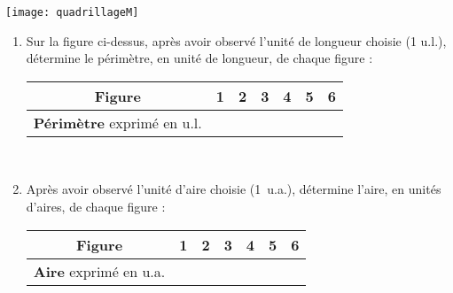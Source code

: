 \begin{exercice}[Quadrillage]
\begin{center} \texttt{[image: quadrillageM]} \end{center}
\begin{enumerate}
 \item Sur la figure ci-dessus, après avoir observé l’unité de longueur choisie (1 u.l.), détermine le périmètre, en unité de longueur, de chaque figure :
 \begin{tabularx}{\linewidth}{|c|X|X|X|X|X|X|}
\hline
\textbf{Figure} & \textbf{1} & \textbf{2} & \textbf{3} & \textbf{4} & \textbf{5} & \textbf{6} \\\hline
\textbf{Périmètre} exprimé en u.l. & & & & & & \\\hline
 \end{tabularx} \\ 
 \item Après avoir observé l’unité d’aire choisie (1 u.a.), détermine l’aire, en unités d’aires, de chaque figure :
  \begin{tabularx}{\linewidth}{|c|X|X|X|X|X|X|}
\hline
\textbf{Figure} & \textbf{1} & \textbf{2} & \textbf{3} & \textbf{4} & \textbf{5} & \textbf{6} \\\hline
\textbf{Aire} exprimé en u.a. & & & & & & \\\hline
 \end{tabularx} \\ 
 \end{enumerate}
\end{exercice}


